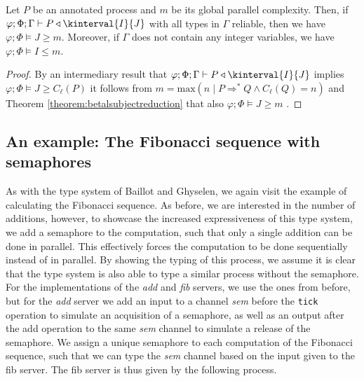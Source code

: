 \begin{theorem}
Let $P$ be an annotated process and $m$ be its global parallel complexity. Then, if $\varphi;\Phi;\Gamma \vdash P \triangleleft \kinterval{I}{J}$ with all types in $\Gamma$ reliable, then we have $\varphi;\Phi \vDash J \geq m$. Moreover, if $\Gamma$ does not contain any integer variables, we have $\varphi;\Phi \vDash I \leq m$.
\end{theorem}
\begin{proof}
By an intermediary result that $\varphi;\Phi;\Gamma \vdash P \triangleleft \kinterval{I}{J}$ implies $\varphi;\Phi\vDash J\geq C_\ell(P)$ it follows from $m = \text{max}(n \mid P \Rightarrow^* Q \land C_\ell(Q)=n)$ and Theorem \ref{theorem:betalsubjectreduction} that also $\varphi;\Phi\vDash J\geq m$ \cite{BaillotEtAl2021}.
\end{proof}

\subsection{An example: The Fibonacci sequence with semaphores}\label{sec:sizedwithusagesexample}

As with the type system of Baillot and Ghyselen, we again visit the example of calculating the Fibonacci sequence. As before, we are interested in the number of additions, however, to showcase the increased expressiveness of this type system, we add a semaphore to the computation, such that only a single addition can be done in parallel. This effectively forces the computation to be done sequentially instead of in parallel. By showing the typing of this process, we assume it is clear that the type system is also able to type a similar process without the semaphore. For the implementations of the \textit{add} and \textit{fib} servers, we use the ones from before, but for the \textit{add} server we add an input to a channel \textit{sem} before the \texttt{tick} operation to simulate an acquisition of a semaphore, as well as an output after the add operation to the same \textit{sem} channel to simulate a release of the semaphore. We assign a unique semaphore to each computation of the Fibonacci sequence, such that we can type the \textit{sem} channel based on the input given to the fib server. The fib server is thus given by the following process.

